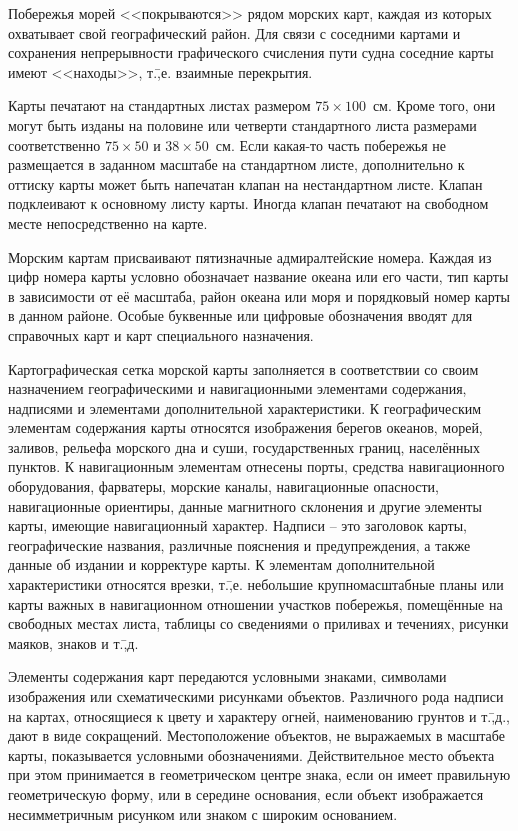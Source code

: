 Побережья морей <<покрываются>> рядом морских карт, каждая из которых
охватывает свой географический район. Для связи с соседними картами и
сохранения непрерывности графического счисления пути судна соседние
карты имеют <<находы>>, т.\=,е. взаимные перекрытия.

Карты печатают на стандартных листах размером $75 \times
100$~см. Кроме того, они могут быть изданы на половине или четверти
стандартного листа размерами соответственно $75 \times 50$ и
$38 \times 50$~см. Если какая-то часть побережья не размещается в
заданном масштабе на стандартном листе, дополнительно к оттиску карты
может быть напечатан клапан на нестандартном листе. Клапан подклеивают
к основному листу карты. Иногда клапан печатают на свободном месте
непосредственно на карте.

Морским картам присваивают пятизначные адмиралтейские номера. Каждая
из цифр номера карты условно обозначает название океана или его части,
тип карты в зависимости от её масштаба, район океана или моря и
порядковый номер карты в данном районе. Особые буквенные или цифровые
обозначения вводят для справочных карт и карт специального назначения.

Картографическая сетка морской карты заполняется в соответствии со
своим назначением географическими и навигационными элементами
содержания, надписями и элементами дополнительной характеристики. К
географическим элементам содержания карты относятся изображения
берегов океанов, морей, заливов, рельефа морского дна и суши,
государственных границ, населённых пунктов. К навигационным элементам
отнесены порты, средства навигационного оборудования, фарватеры,
морские каналы, навигационные опасности, навигационные ориентиры,
данные магнитного склонения и другие элементы карты, имеющие
навигационный характер. Надписи \--- это заголовок карты,
географические названия, различные пояснения и предупреждения, а также
данные об издании и корректуре карты. К элементам дополнительной
характеристики относятся врезки, т.\=,е. небольшие крупномасштабные
планы или карты важных в навигационном отношении участков побережья,
помещённые на свободных местах листа, таблицы со сведениями о приливах
и течениях, рисунки маяков, знаков и т.\=,д.
 
Элементы содержания карт передаются условными знаками, символами
изображения или схематическими рисунками объектов. Различного рода
надписи на картах, относящиеся к цвету и характеру огней, наименованию
грунтов и т.\=,д., дают в виде сокращений. Местоположение объектов, не
выражаемых в масштабе карты, показывается условными
обозначениями. Действительное место объекта при этом принимается в
геометрическом центре знака, если он имеет правильную геометрическую
форму, или в середине основания, если объект изображается
несимметричным рисунком или знаком с широким основанием.


